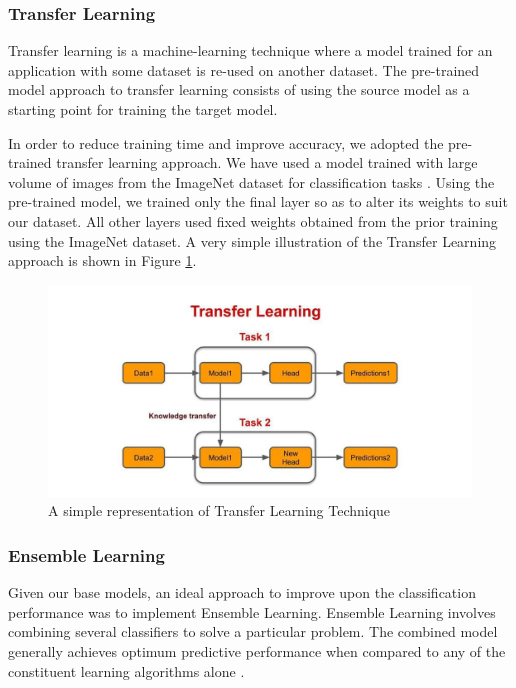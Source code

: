 \subsubsection{Transfer Learning} \label{tl}
Transfer learning is a machine-learning technique where a model trained for an application with some dataset is re-used on another dataset. The pre-trained model approach to transfer learning consists of using the source model as a starting point for training the target model. 

In order to reduce training time and improve accuracy, we adopted the pre-trained transfer learning approach. We have used a model trained with large volume of images from the ImageNet dataset for classification tasks \cite{IMG}. Using the pre-trained model, we trained only the final layer so as to alter its weights to suit our dataset. All other layers used fixed weights obtained from the prior training using the ImageNet dataset. A very simple illustration of the Transfer Learning approach is shown in Figure \ref{fig:transfer learning}. 


\begin{figure}[htbp]
	\centering
	\includegraphics[width=15cm]{Images/Transfer Learning.jpg}
	\caption{\small A simple representation of Transfer Learning Technique \cite{TBT2019}}
	\label{fig:transfer learning}
\end{figure}

\subsubsection{Ensemble Learning} \label{elx}

Given our base models, an ideal approach to improve upon the classification performance was to implement Ensemble Learning. Ensemble Learning involves combining several classifiers to solve a particular problem. The combined model generally achieves optimum predictive performance when compared to any of the constituent learning algorithms alone \cite{POL2019, LUT2017}.

